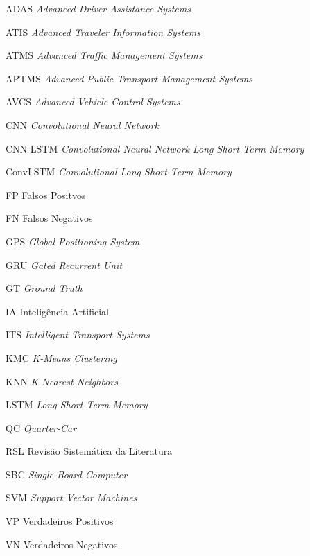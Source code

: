 \begin{siglas}
\item[ADAS] \textit{Advanced Driver-Assistance Systems}
\item[ATIS] \textit{Advanced Traveler Information Systems}
\item[ATMS] \textit{Advanced Traffic Management Systems}
\item[APTMS] \textit{Advanced Public Transport Management Systems}
\item[AVCS] \textit{Advanced Vehicle Control Systems}
\item[CNN] \textit{Convolutional Neural Network}
\item[CNN-LSTM] \textit{Convolutional Neural Network Long Short-Term Memory}
\item[ConvLSTM] \textit{Convolutional Long Short-Term Memory}
\item[FP] Falsos Positvos
\item[FN] Falsos Negativos
\item[GPS] \textit{Global Positioning System}
\item[GRU] \textit{Gated Recurrent Unit}
\item[GT] \textit{Ground Truth}
\item[IA] Inteligência  Artificial
\item[ITS] \textit{Intelligent Transport Systems}
\item[KMC] \textit{K-Means Clustering}
\item[KNN] \textit{K-Nearest Neighbors}
\item[LSTM] \textit{Long Short-Term Memory}
\item[QC] \textit{Quarter-Car}
\item[RSL] Revisão Sistemática da Literatura
\item[SBC] \textit{Single-Board  Computer}
\item[SVM] \textit{Support Vector Machines}
\item[VP] Verdadeiros Positivos
\item[VN] Verdadeiros Negativos
\end{siglas}
